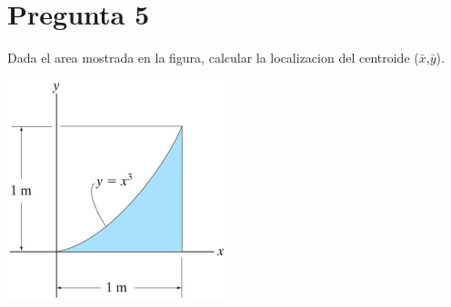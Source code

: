 \documentclass[11pt, oneside]{article}   	%
\begin{document}
\section*{Pregunta 5}\vspace{-0.3cm}
Dada el area mostrada en la figura, calcular la localizacion del centroide ($\bar{x}$,$\bar{y}$).
\vspace{-0.2cm}
\begin{center}
\includegraphics[scale=2.0]{exer5}
\end{center}

	
\end{document}
